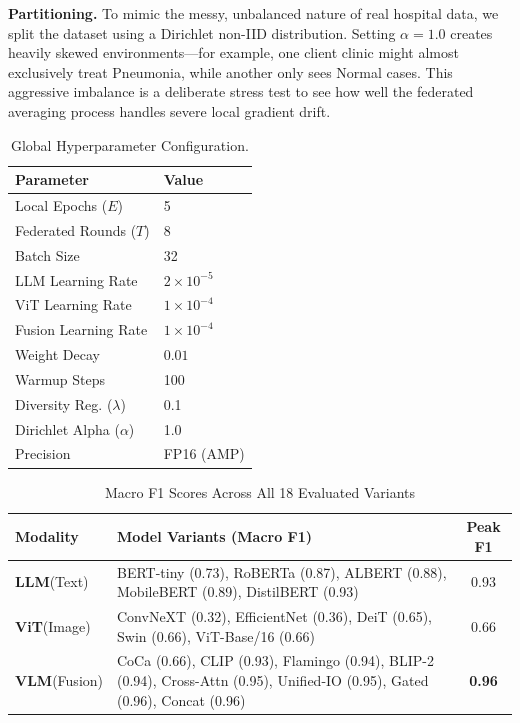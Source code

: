 \documentclass[letterpaper, conference]{IEEEtran}
\begin{document}
\textbf{Partitioning.}
To mimic the messy, unbalanced nature of real hospital data, we split the dataset using a Dirichlet non-IID distribution. Setting $\alpha=1.0$ creates heavily skewed environments---for example, one client clinic might almost exclusively treat Pneumonia, while another only sees Normal cases. This aggressive imbalance is a deliberate stress test to see how well the federated averaging process handles severe local gradient drift.

\begin{table}[t]
\caption{Global Hyperparameter Configuration.}
\label{tab:hyper}
\centering\footnotesize
\begin{tabular}{ll}
\toprule
\textbf{Parameter} & \textbf{Value} \\
\midrule
Local Epochs ($E$) & 5 \\
Federated Rounds ($T$) & 8 \\
Batch Size & 32 \\
LLM Learning Rate & $2 \times 10^{-5}$ \\
ViT Learning Rate & $1 \times 10^{-4}$ \\
Fusion Learning Rate & $1 \times 10^{-4}$ \\
Weight Decay & $0.01$ \\
Warmup Steps & 100 \\
Diversity Reg. ($\lambda$) & 0.1 \\
Dirichlet Alpha ($\alpha$) & 1.0 \\
Precision & FP16 (AMP) \\
\bottomrule
\end{tabular}
\end{table}

\begin{table}[t]
\caption{Macro F1 Scores Across All 18 Evaluated Variants}
\label{tab:performance_variants}
\centering
\footnotesize
\renewcommand{\arraystretch}{1.4} %
\begin{tabular}{>{\raggedright\arraybackslash}p{1.4cm} >{\raggedright\arraybackslash}p{5.2cm} c}
\toprule
\textbf{Modality} & \textbf{Model Variants (Macro F1)} & \textbf{Peak F1} \\
\midrule
\textbf{LLM}\newline(Text) & BERT-tiny (0.73), RoBERTa (0.87), ALBERT (0.88), MobileBERT (0.89), DistilBERT (0.93) & 0.93 \\
\midrule
\textbf{ViT}\newline(Image) & ConvNeXT (0.32), EfficientNet (0.36), DeiT (0.65), Swin (0.66), ViT-Base/16 (0.66) & 0.66 \\
\midrule
\textbf{VLM}\newline(Fusion) & CoCa (0.66), CLIP (0.93), Flamingo (0.94), BLIP-2 (0.94), Cross-Attn (0.95), Unified-IO (0.95), Gated (0.96), Concat (0.96) & \textbf{0.96} \\
\bottomrule
\end{tabular}
\end{table}
\end{document}

